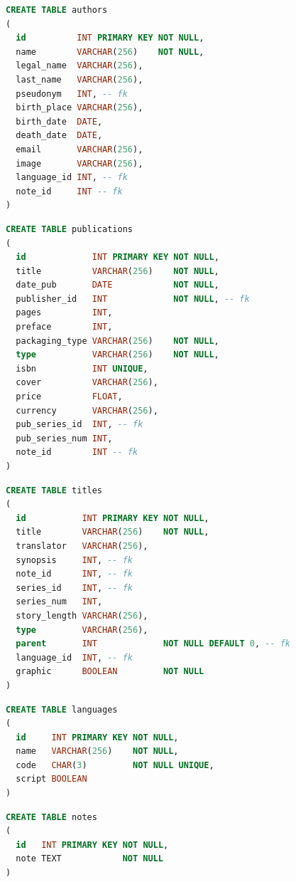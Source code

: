 \documentclass[doubleside, titlepage]{article}
\begin{document}
\begin{lstlisting}[language=SQL,showspaces=false,basicstyle=\ttfamily,numberstyle=\tiny,commentstyle=\color{gray}
        ]
CREATE TABLE authors
(
  id          INT PRIMARY KEY NOT NULL,
  name        VARCHAR(256)    NOT NULL,
  legal_name  VARCHAR(256),
  last_name   VARCHAR(256),
  pseudonym   INT, -- fk
  birth_place VARCHAR(256),
  birth_date  DATE,
  death_date  DATE,
  email       VARCHAR(256),
  image       VARCHAR(256),
  language_id INT, -- fk
  note_id     INT -- fk
)
\end{lstlisting}

\begin{lstlisting}[language=SQL,showspaces=false,basicstyle=\ttfamily,numberstyle=\tiny,commentstyle=\color{gray}
        ]
CREATE TABLE publications
(
  id             INT PRIMARY KEY NOT NULL,
  title          VARCHAR(256)    NOT NULL,
  date_pub       DATE            NOT NULL,
  publisher_id   INT             NOT NULL, -- fk
  pages          INT,
  preface        INT,
  packaging_type VARCHAR(256)    NOT NULL,
  type           VARCHAR(256)    NOT NULL,
  isbn           INT UNIQUE,
  cover          VARCHAR(256),
  price          FLOAT,
  currency       VARCHAR(256),
  pub_series_id  INT, -- fk
  pub_series_num INT,
  note_id        INT -- fk
)
\end{lstlisting}

\begin{lstlisting}[language=SQL,showspaces=false,basicstyle=\ttfamily,numberstyle=\tiny,commentstyle=\color{gray}
        ]
CREATE TABLE titles
(
  id           INT PRIMARY KEY NOT NULL,
  title        VARCHAR(256)    NOT NULL,
  translator   VARCHAR(256),
  synopsis     INT, -- fk
  note_id      INT, -- fk
  series_id    INT, -- fk
  series_num   INT,
  story_length VARCHAR(256),
  type         VARCHAR(256),
  parent       INT             NOT NULL DEFAULT 0, -- fk
  language_id  INT, -- fk
  graphic      BOOLEAN         NOT NULL
)
\end{lstlisting}

\newpage

\begin{lstlisting}[language=SQL,showspaces=false,basicstyle=\ttfamily,numberstyle=\tiny,commentstyle=\color{gray}
        ]
CREATE TABLE languages
(
  id     INT PRIMARY KEY NOT NULL,
  name   VARCHAR(256)    NOT NULL,
  code   CHAR(3)         NOT NULL UNIQUE,
  script BOOLEAN
)
\end{lstlisting}

\begin{lstlisting}[language=SQL,showspaces=false,basicstyle=\ttfamily,numberstyle=\tiny,commentstyle=\color{gray}
        ]
CREATE TABLE notes
(
  id   INT PRIMARY KEY NOT NULL,
  note TEXT            NOT NULL
)
\end{lstlisting}
\end{document}
